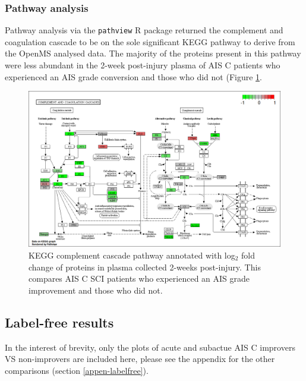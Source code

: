 \documentclass[
]{article}
\begin{document}
\hypertarget{kegg-chap3}{%
\subsubsection{Pathway analysis}\label{kegg-chap3}}

Pathway analysis via the \texttt{pathview} R package returned the complement and coagulation cascade to be on the sole significant KEGG pathway to derive from the OpenMS analysed data.
The majority of the proteins present in this pathway were less abundant in the 2-week post-injury plasma of AIS C patients who experienced an AIS grade conversion and those who did not (Figure \ref{fig:kegg-complement}.



\begin{figure}

{\centering \includegraphics[width=18.31in]{figures/kegg_pathways/hsa04610_pathview} 

}

\caption{KEGG complement cascade pathway annotated with log\(_2\) fold change of proteins in plasma collected 2-weeks post-injury. This compares AIS C SCI patients who experienced an AIS grade improvement and those who did not.}\label{fig:kegg-complement}
\end{figure}

\clearpage

\hypertarget{chap-4-results}{%
\subsection{Label-free results}\label{chap-4-results}}

In the interest of brevity, only the plots of acute and subactue AIS C improvers VS non-improvers are included here, please see the appendix for the other comparisons (section \ref{appen-labelfree}).
\end{document}
